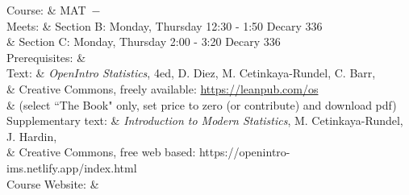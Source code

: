 \textsf{Course:} & MAT \coursenum \,$-$ \coursename \\

\textsf{Meets:} & Section B: Monday, Thursday 12:30 - 1:50 Decary 336 \\
 & Section C: Monday, Thursday 2:00 - 3:20 Decary 336 \\


\textsf{Prerequisites:} & \prerequisite \\


\textsf{Text:} & {\it OpenIntro Statistics}, 4ed, D. Diez, M. Cetinkaya-Rundel, C. Barr,\\

&  Creative Commons, freely available: \url{https://leanpub.com/os} \\
& (select ``The Book" only, set price to zero (or contribute) and download pdf) \\

\textsf{Supplementary text:} & {\it Introduction to Modern Statistics}, M. Cetinkaya-Rundel, J. Hardin,  \\
& Creative Commons, free web based: https://openintro-ims.netlify.app/index.html \\



\textsf{Course Website:} & \website \\




